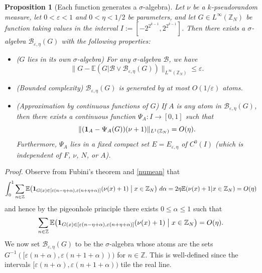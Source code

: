 \documentclass[12pt,a4paper,reqno]{amsart}
\numberwithin{equation}{section}
\theoremstyle{plain}
\newtheorem{proposition}[subsection]{Proposition}
\theoremstyle{definition}
\renewcommand{\leq}{\leqslant}
\def\B{{\mathcal B}}
\def\Z{{\mathbb Z}}
\def\E{{\mathbb E}}
\def\eps{{\varepsilon}}
\def\vs{\vspace{11pt}}
\def\proof{\noindent\textit{Proof. }}
\begin{document}
\begin{proposition}[Each function generates a $\sigma$-algebra]\label{sigma-gen}  Let $\nu$ be a $k$-pseudorandom measure, let $0 < \eps < 1$ and $0 < \eta < 1/2$ be parameters, and let $G \in L^\infty(\Z_N)$ be function taking values in the interval $I := [-2^{2^{k-1}}, 2^{2^{k-1}} ]$.
Then there exists a $\sigma$-algebra $\B_{\eps,\eta}(G)$ with the following properties:
\begin{itemize}

\item \textup{($G$ lies in its own $\sigma$-algebra)} For any $\sigma$-algebra $\B$, we have
\begin{equation}\label{trivial}
\| G - \E( G | \B \vee \B_{\eps,\eta}(G)) \|_{L^\infty(\Z_N)} \leq \eps.
\end{equation}

\item \textup{(Bounded complexity)} $\B_{\eps,\eta}(G)$ is generated by at most $O(1/\eps)$ atoms.

\item \textup{(Approximation by continuous functions of $G$)}  If $A$ is any atom in $\B_{\eps,\eta}(G)$, then there exists a continuous function
$\Psi_A: I \to [0,1]$ such that 
\begin{equation}\label{nup-bound}
\| ({\bf 1}_A - \Psi_A(G))(\nu + 1) \|_{L^1(\Z_N)} = O(\eta).
\end{equation}
Furthermore, $\Psi_A$ lies in a fixed compact set $E = E_{\eps,\eta}$ of $C^0(I)$ \textup{(}which is independent of $F$, $\nu$, $N$, or $A$\textup{)}.

\end{itemize}

\end{proposition}

\proof 
Observe from Fubini's theorem and \eqref{numean} that
$$ 
\int_0^1
\sum_{n \in \Z} \E\big( {\bf 1}_{G(x) \in [\eps(n-\eta+\alpha), \eps(n+\eta+\alpha)]} (\nu(x)+1) \; \big| \; x \in \Z_N \big)\ d\alpha
= 2\eta \E( \nu(x)+1 | x \in \Z_N ) = O(\eta) $$
and hence by the pigeonhole principle there exists $0 \leq \alpha \leq 1$ such that
\begin{equation}\label{dual-shift}
\sum_{n \in \Z} \E\big( {\bf 1}_{G(x) \in [\eps(n-\eta+\alpha), \eps(n+\eta+\alpha)]} (\nu(x)+1) \; \big| \; x \in \Z_N \big) = O( \eta ).
\end{equation}
We now set $\B_{\eps,\eta}(G)$ to be the $\sigma$-algebra whose atoms are the sets $G^{-1}([\eps (n+\alpha), \eps(n+1+\alpha)))$ for $n \in \Z$.  This is well-defined since the intervals $[\eps (n+\alpha), \eps(n+1+\alpha))$ tile the real line.\vs
\end{document}
